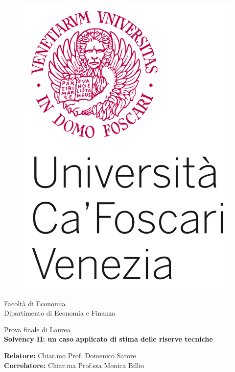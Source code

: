 \thispagestyle{empty}
\begin{titlepage}
\begin{figure}[htbp]
\includegraphics[scale=0.5]{Immagini/logo.jpg}
\end{figure}
\begin{flushleft}

{\huge  Facoltà di Economia} \\
 \vspace*{0.3cm}
{\Large Dipartimento di Economia e Finanza} \\
  \vspace*{1cm}

{\large Prova finale di Laurea} \\
 \vspace*{1cm}
{\bfseries Solvency II: un caso applicato di stima delle riserve tecniche}
\end{flushleft}
\vspace*{3.0cm}
\begin{flushleft}
{\bfseries Relatore:} Chiar.mo Prof. Domenico Sarore \\
{\bfseries Correlatore:} Chiar.ma Prof.ssa Monica Billio \\


\end{flushleft}
\end{titlepage}
